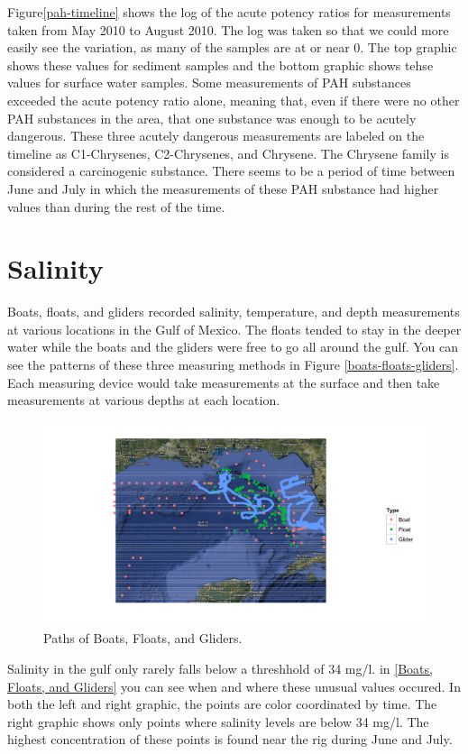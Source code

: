 \documentclass[11pt]{article}
\begin{document}
Figure\ref {pah-timeline} shows the log of the acute potency ratios for measurements taken from May 2010 to August 2010. The log was taken so that we could more easily see the variation, as many of the samples are at or near 0. The top graphic shows these values for sediment samples and the bottom graphic shows tehse values for surface water samples.  Some measurements of PAH substances exceeded the acute potency ratio alone, meaning that, even if there were no other PAH substances in the area, that one substance was enough to be acutely dangerous.  These three acutely dangerous measurements are labeled on the timeline as C1-Chrysenes, C2-Chrysenes, and Chrysene.  The Chrysene family is considered a carcinogenic substance.  There seems to be a period of time between June and July in which the measurements of these PAH substance had higher values than during the rest of the time.    

\section{Salinity}
Boats, floats, and gliders recorded salinity, temperature, and depth measurements at various locations in the Gulf of Mexico. The floats tended to stay in the deeper water while the boats and the gliders were free to go all around the gulf.  You can see the patterns of these three measuring methods in Figure \ref {boats-floats-gliders}. Each measuring device would take measurements at the surface and then take measurements at various depths at each location.  

\begin{figure}[htbp] %
   \centering
   \includegraphics[width=5in]{boats-floats-gliders.png} 
   \caption{Paths of Boats, Floats, and Gliders. }
   \label{Boats, Floats and Gliders}
\end{figure}
Salinity in the gulf only rarely falls below a threshhold of 34 mg/l. in \ref {Boats, Floats, and Gliders} you can see when and where these unusual values occured.  In both the left and right graphic, the points are color coordinated by time. The right graphic shows only points where salinity levels are below 34 mg/l. The highest concentration of these points is found near the rig during June and July.  
\end{document}
